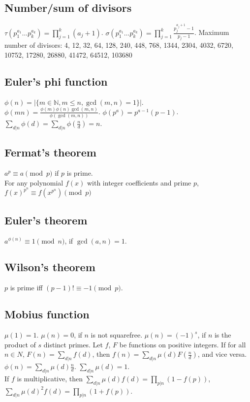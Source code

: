\documentclass[12pt]{extarticle}
\begin{document}
\begin{multicols*}{2}
\subsection{Number/sum of divisors}
$\tau(p_1^{a_1} \dots p_k^{a_k}) = \prod_{j=1}^k (a_j+1)$. \quad
$\sigma(p_1^{a_1} \dots p_k^{a_k}) = \prod_{j=1}^k \frac{p_j^{a_j+1}-1}{p_j-1}$.
Maximum number of divisors: 4, 12, 32, 64, 128, 240, 448, 768, 1344, 2304, 4032, 6720, 10752, 17280, 26880, 41472, 64512, 103680

\subsection{Euler's phi function}
$\phi(n)=|\{m \in {\mathbb N}, m \le n, \gcd(m, n) = 1 \}|$. \\
$\phi(mn) = \frac{\phi(m) \phi(n) \gcd(m,n)}{\phi(\gcd(m,n))}$. \quad
$\phi(p^a) = p^{a-1} (p-1)$. \quad
$\sum_{d|n} \phi(d) = \sum_{d|n} \phi(\frac{n}{d}) = n$.

\subsection{Fermat's theorem}  $a^p \equiv a \pmod{p}$ if $p$ is prime. \\
For any polynomial $f(x)$ with integer coefficients and prime $p$,
$f(x)^{p^n} \equiv f(x^{p^n}) \pmod{p}$
\subsection{Euler's theorem} $a^{\phi(n)} \equiv 1\pmod{n}$, if $\gcd(a,n)=1$. \\
\subsection{Wilson's theorem} $p$ is prime iff $(p - 1)! \equiv -1 \pmod p$.

\subsection{Mobius function}
$\mu(1) = 1$. $\mu(n) = 0$, if $n$ is not squarefree.
$\mu(n) = (-1)^s$, if $n$ is the product of $s$ distinct primes.
Let $f$, $F$ be functions on positive integers.
If for all $n \in N$, $F(n)=\sum_{d|n} f(d)$, then $f(n) = \sum_{d|n} \mu(d) F(\frac{n}{d})$,
and vice versa. \quad
$\phi(n) = \sum_{d|n} \mu(d) \frac{n}{d}$.
\quad $\sum_{d|n} \mu(d) = 1$. \\
If $f$ is multiplicative, then $\sum_{d|n} \mu(d) f(d) = \prod_{p|n}(1-f(p))$,
$\sum_{d|n} \mu(d)^2 f(d) = \prod_{p|n} (1+f(p))$.


\end{multicols*}
\end{document}
